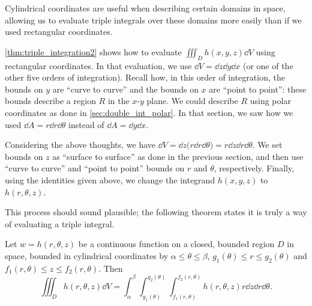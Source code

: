 Cylindrical coordinates are useful when describing certain domains in space, allowing us to evaluate triple integrals over these domains more easily than if we used rectangular coordinates.

\autoref{thm:triple_integration2} shows how to evaluate $\iiint_Dh(x,y,z)\dd V$ using rectangular coordinates. In that evaluation, we use $\dd V = \dd z\dd y\dd x$ (or one of the other five orders of integration). Recall how, in this order of integration, the bounds on $y$ are ``curve to curve'' and the bounds on $x$ are ``point to point'': these bounds describe a region $R$ in the $x$-$y$ plane. We could describe $R$ using polar coordinates as done in \autoref{sec:double_int_polar}. In that section, we saw how we used $\dd A = r\dd r\dd\theta$ instead of $\dd A = \dd y\dd x$. 

Considering the above thoughts, we have $\dd V = \dd z\bigl(r\dd r\dd\theta\bigr) = r\dd z\dd r\dd\theta$. We set bounds on $z$ as ``surface to surface'' as done in the previous section, and then use ``curve to curve'' and ``point to point'' bounds on $r$ and $\theta$, respectively. Finally, using the identities given above, we change the integrand $h(x,y,z)$ to $h(r,\theta,z)$.

This process should sound plausible; the following theorem states it is truly a way of evaluating a triple integral.

\begin{theorem}\label{thm:triple_int_cylindrical}%
%
Let $w=h(r,\theta,z)$ be a continuous function on a closed, bounded region $D$ in space, bounded in cylindrical coordinates by $\alpha \leq \theta \leq \beta$, $g_1(\theta)\leq r \leq g_2(\theta)$ and $f_1(r,\theta) \leq z \leq f_2(r,\theta)$. Then  
\[
\iiint_D h(r,\theta,z)\dd V = \int_\alpha^\beta\int_{g_1(\theta)}^{g_2(\theta)}\int_{f_1(r,\theta)}^{f_2(r,\theta)}h(r,\theta,z) r\dd z\dd r\dd\theta.
\]
\end{theorem}


